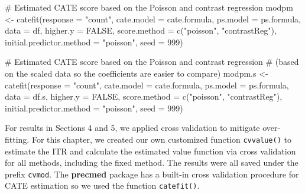 \documentclass[
  letterpaper,
  DIV=11,
  numbers=noendperiod]{scrreprt}
\newenvironment{Shaded}{\begin{snugshade}}{\end{snugshade}}
\newcommand{\AttributeTok}[1]{\textcolor[rgb]{0.40,0.45,0.13}{#1}}
\newcommand{\CommentTok}[1]{\textcolor[rgb]{0.37,0.37,0.37}{#1}}
\newcommand{\ConstantTok}[1]{\textcolor[rgb]{0.56,0.35,0.01}{#1}}
\newcommand{\DecValTok}[1]{\textcolor[rgb]{0.68,0.00,0.00}{#1}}
\newcommand{\FunctionTok}[1]{\textcolor[rgb]{0.28,0.35,0.67}{#1}}
\newcommand{\NormalTok}[1]{\textcolor[rgb]{0.00,0.23,0.31}{#1}}
\newcommand{\OtherTok}[1]{\textcolor[rgb]{0.00,0.23,0.31}{#1}}
\newcommand{\StringTok}[1]{\textcolor[rgb]{0.13,0.47,0.30}{#1}}
\begin{document}
\begin{Shaded}
\begin{Highlighting}[]
\CommentTok{\# Estimated CATE score based on the Poisson and contrast regression }
\NormalTok{modpm }\OtherTok{\textless{}{-}} \FunctionTok{catefit}\NormalTok{(}\AttributeTok{response =} \StringTok{"count"}\NormalTok{,}
            \AttributeTok{cate.model =}\NormalTok{ cate.formula,}
            \AttributeTok{ps.model =}\NormalTok{ ps.formula,}
            \AttributeTok{data =}\NormalTok{ df,}
            \AttributeTok{higher.y =} \ConstantTok{FALSE}\NormalTok{,}
            \AttributeTok{score.method =} \FunctionTok{c}\NormalTok{(}\StringTok{"poisson"}\NormalTok{, }\StringTok{"contrastReg"}\NormalTok{),}
            \AttributeTok{initial.predictor.method =} \StringTok{"poisson"}\NormalTok{,}
            \AttributeTok{seed =} \DecValTok{999}\NormalTok{)}

\CommentTok{\# Estimated CATE score based on the Poisson and contrast regression }
\CommentTok{\# (based on the scaled data so the coefficients are easier to compare)}
\NormalTok{modpm.s }\OtherTok{\textless{}{-}} \FunctionTok{catefit}\NormalTok{(}\AttributeTok{response =} \StringTok{"count"}\NormalTok{,}
              \AttributeTok{cate.model =}\NormalTok{ cate.formula,}
              \AttributeTok{ps.model =}\NormalTok{ ps.formula,}
              \AttributeTok{data =}\NormalTok{ df.s,}
              \AttributeTok{higher.y =} \ConstantTok{FALSE}\NormalTok{,}
              \AttributeTok{score.method =} \FunctionTok{c}\NormalTok{(}\StringTok{"poisson"}\NormalTok{, }\StringTok{"contrastReg"}\NormalTok{),}
              \AttributeTok{initial.predictor.method =} \StringTok{"poisson"}\NormalTok{,}
              \AttributeTok{seed =} \DecValTok{999}\NormalTok{)}
\end{Highlighting}
\end{Shaded}

For results in Sections 4 and 5, we applied cross validation to mitigate
over-fitting. For this chapter, we created our own customized function
\texttt{cvvalue()} to estimate the ITR and calculate the estimated value
function via cross validation for all methods, including the fixed
method. The results were all saved under the prefix \texttt{cvmod}. The
\textbf{precmed} package has a built-in cross validation procedure for
CATE estimation so we used the function \texttt{catefit()}.
\end{document}
